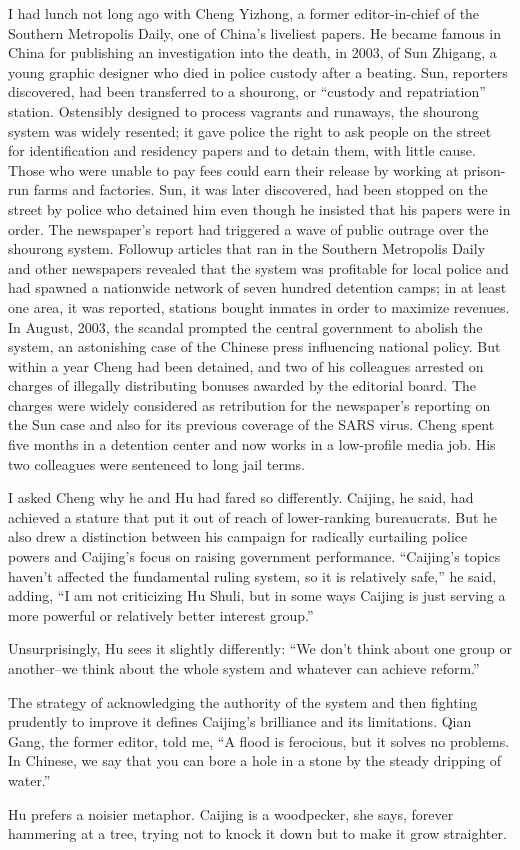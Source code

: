 ﻿\documentclass[12pt]{article}
\begin{document}
I had lunch not long ago with Cheng Yizhong, a former editor-in-chief of the Southern Metropolis
Daily, one of China's liveliest papers. He became famous in China for publishing an investigation
into the death, in 2003, of Sun Zhigang, a young graphic designer who died in police custody after a
beating. Sun, reporters discovered, had been transferred to a shourong, or ``custody and
repatriation'' station. Ostensibly designed to process vagrants and runaways, the shourong system
was widely resented; it gave police the right to ask people on the street for identification and
residency papers and to detain them, with little cause. Those who were unable to pay fees could earn
their release by working at prison-run farms and factories. Sun, it was later discovered, had been
stopped on the street by police who detained him even though he insisted that his papers were in
order. The newspaper's report had triggered a wave of public outrage over the shourong system.
Followup articles that ran in the Southern Metropolis Daily and other newspapers revealed that the
system was profitable for local police and had spawned a nationwide network of seven hundred
detention camps; in at least one area, it was reported, stations bought inmates in order to maximize
revenues. In August, 2003, the scandal prompted the central government to abolish the system, an
astonishing case of the Chinese press influencing national policy. But within a year Cheng had been
detained, and two of his colleagues arrested on charges of illegally distributing bonuses awarded by
the editorial board. The charges were widely considered as retribution for the newspaper's reporting
on the Sun case and also for its previous coverage of the SARS virus. Cheng spent five months in a
detention center and now works in a low-profile media job. His two colleagues were sentenced to long
jail terms.

I asked Cheng why he and Hu had fared so differently. Caijing, he said, had achieved a stature that
put it out of reach of lower-ranking bureaucrats. But he also drew a distinction between his
campaign for radically curtailing police powers and Caijing's focus on raising government
performance. ``Caijing's topics haven't affected the fundamental ruling system, so it is relatively
safe,'' he said, adding, ``I am not criticizing Hu Shuli, but in some ways Caijing is just serving a
more powerful or relatively better interest group.''

Unsurprisingly, Hu sees it slightly differently: ``We don't think about one group or another--we
think about the whole system and whatever can achieve reform.''

The strategy of acknowledging the authority of the system and then fighting prudently to improve it
defines Caijing's brilliance and its limitations. Qian Gang, the former editor, told me, ``A flood
is ferocious, but it solves no problems. In Chinese, we say that you can bore a hole in a stone by
the steady dripping of water.''

Hu prefers a noisier metaphor. Caijing is a woodpecker, she says, forever hammering at a tree, trying not to knock it down but to make it grow straighter.
\end{document}
